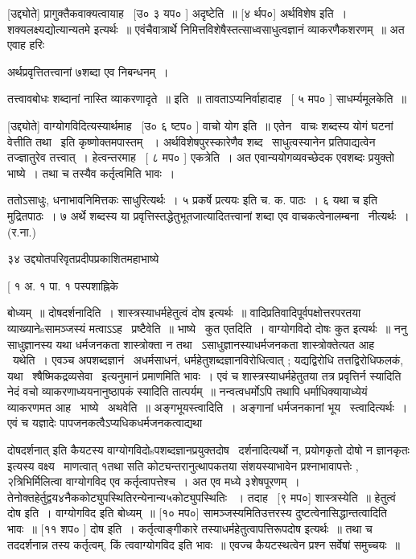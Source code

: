 \documentclass[11pt, openany]{book}
\begin{document}
 [उद्द्योते] प्रागुक्तैकवाक्यत्वायाह \textendash\ [उ० ३ यप० ] अदृष्टेति~॥
[४ र्थप०] अर्थविशेष इति~। शक्यलक्ष्यद्योत्यान्यतमे इत्यर्थः~॥
एवंचैवात्रार्थे निमित्तविशेषैस्तत्साध्वसाधुत्वज्ञानं व्याकरणैकशरणम्~॥
अत एवाह हरिः \textendash\ 

 अर्थप्रवृत्तितत्त्वानां ७शब्दा एव निबन्धनम्~। 

 तत्त्वावबोधः शब्दानां नास्ति व्याकरणादृते~॥ इति~॥
तावताऽप्यनिर्वाहादाह \textendash\ [ ५ मप० ] साधर्म्यमूलकेति~॥ 

 [उद्द्योते] वाग्योगविदित्यस्यार्थमाह \textendash\ [उ० ६ ष्टप० ] वाचो योग
इति~॥ एतेन \textendash\ वाचः शब्दस्य योगं घटनां वेत्तीति तथा \textendash\ इति कृष्णोक्तमपास्तम्
~। अर्थविशेषपुरस्कारेणैव शब्द \textendash\ साधुत्वस्यानेन प्रतिपाद्यत्वेन तज्ज्ञातुरेव
तत्त्वात्~। हेत्वन्तरमाह \textendash\ [ ८ मप० ] एकत्रेति~। अत एवान्ययोगव्यवच्छेदक
एवशब्दः प्रयुक्तो भाष्ये~। तथा च तस्यैव कर्तृत्वमिति भावः~। 



ततोऽसाधुः, धनाभावनिमित्तकः साधुरित्यर्थः~। ५ प्रकर्षे प्रत्ययः इति च.
क. पाठः~। ६ {\qt यथा च} इति मुद्रितपाठः~। ७ अर्थे शब्दस्य या
प्रवृत्तिस्तद्धेतुभूतजात्यादितत्त्वानां शब्दा एव वाचकत्वेनालम्बना \textendash\ 
नीत्यर्थः~। (र.ना.) 

३४ उद्द्योतपरिवृतप्रदीपप्रकाशितमहाभाष्ये \textendash\ 

 [ १ अ. १ पा. १ पस्पशाह्निके



बोध्यम्~॥ दोषदर्शनादिति~। शास्त्रस्याधर्महेतुत्वं दोष इत्यर्थः~॥
वादिप्रतिवादिपूर्वपक्षोत्तरपरतया व्याख्यानेsसामञ्जस्यं मत्वाऽऽह \textendash\ 
प्रष्टैवेति~॥ भाष्ये \textendash\ कुत एतदिति~। वाग्योगविदो दोषः कुत इत्यर्थः~॥ ननु
साधुज्ञानस्य यथा धर्मजनकता शास्त्रोक्ता न तथा \textendash\ ऽसाधुज्ञानस्याधर्मजनकता
शास्त्रोक्तेत्यत आह \textendash\ यथेति~। एवञ्च अपशब्दज्ञानं \textendash\ अधर्मसाधनं,
धर्महेतुशब्दज्ञानविरोधित्वात् ; यद्यद्विरोधि तत्तद्विरोधिफलकं,
यथा \textendash\ श्षैष्मिकद्रव्यसेवा \textendash\ इत्यनुमानं प्रमाणमिति भावः~। एवं च
शास्त्रस्याधर्महेतुतया तत्र प्रवृत्तिर्न स्यादिति नेदं वचो
व्याकरणाध्ययनानुष्ठापकं स्यादिति तात्पर्यम्~॥ नन्वत्वधर्मोऽपि तथापि
धर्माधिक्यायाध्येयं व्याकरणमत आह \textendash\ भाष्ये \textendash\ अथवेति~॥ अङ्गभूयस्त्वादिति~। 
अङ्गानां धर्मजनकानां भूय \textendash\ स्त्वादित्यर्थः~। एवं च यज्ञादेः
पापजनकत्वैऽप्यधिकधर्मजनकत्वाद्यथा 



{\qt दोषदर्शनात्} इति कैयटस्य वाग्योगविदोsपशब्दज्ञानप्रयुक्तदोष \textendash\ 
दर्शनादित्यर्थो न, {\qt प्रयोगकृतो दोषो न ज्ञानकृतः} इत्यस्य वक्ष्य \textendash\ 
माणत्वात् १तथा सति कोट्यन्तरानुत्थापकतया संशयस्याभावेन प्रश्नाभावापत्तेः
, २त्रिभिर्मिलित्वा वाग्योगविद एव कर्तृत्वापत्तेश्च~। अत एव मध्ये
३शेषपूरणम्~। तेनोक्तहेर्तुद्वय४नैककोट्युपस्थितिरन्येनान्य५कोट्युपस्थितिः
~। तदाह \textendash\ [९ मप०] शास्त्रस्येति~॥ हेतुत्वं दोष इति~। 
वाग्योगविद इति बोध्यम्~॥ [१० मप०] सामञ्जस्यमितिउत्तरस्य
दुष्टत्वेनासिद्धान्तत्वादिति भावः~॥ [११ शप० ] दोष इति~। 
कर्तृत्वाङ्गीकारे तस्याधर्महेतुत्वापत्तिरूपदोष इत्यर्थः~॥ तथा च
तददर्शनान्न तस्य कर्तृत्वम्, किं त्ववाग्योगविद इति भावः~॥ एवज्च
कैयटस्थत्वेन प्रश्न सर्वेषां समुच्चयः~॥ 
\end{document}
